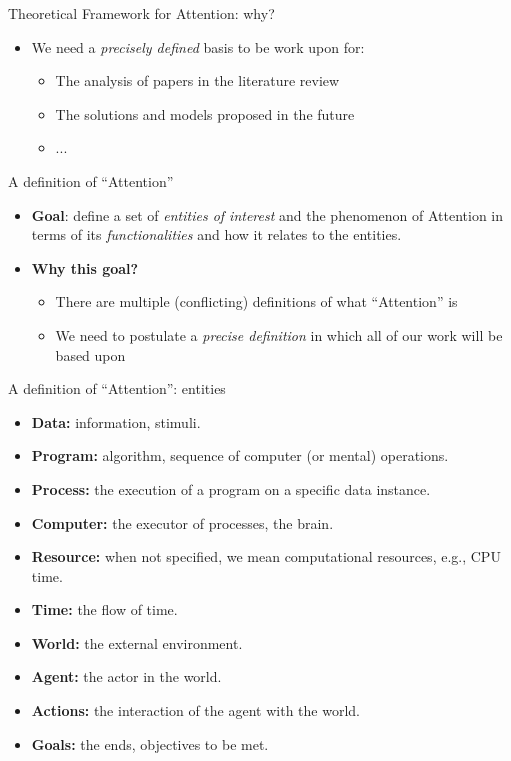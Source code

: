 \documentclass[10pt]{beamer}
\begin{document}
\begin{frame}{Theoretical Framework for Attention: why?}
    \begin{itemize}
        \item We need a \emph{precisely defined} basis to be work upon for:
        \begin{itemize}
            \item The analysis of papers in the literature review
            \item The solutions and models proposed in the future
            \item ...
        \end{itemize}
    \end{itemize}
\end{frame}

\begin{frame}{A definition of ``Attention''}
    \begin{itemize}
        \item \textbf{Goal}: define a set of \emph{entities of interest} and the phenomenon of Attention in terms of its \emph{functionalities} and how it relates to the entities.
        \item \textbf{Why this goal?}
            \begin{itemize}
                \item There are multiple (conflicting) definitions of what ``Attention'' is
                \item We need to postulate a \emph{precise definition} in which all of our work will be based upon
            \end{itemize}
    \end{itemize}
\end{frame}

\begin{frame}{A definition of ``Attention'': entities}
    \begin{itemize}
        \item\textbf{Data:} information, stimuli.
        \item\textbf{Program:} algorithm, sequence of computer (or mental) operations.
        \item\textbf{Process:} the execution of a program on a specific data instance.
        \item\textbf{Computer:} the executor of processes, the brain.
        \item\textbf{Resource:} when not specified, we mean computational resources, e.g., CPU time.
        \item\textbf{Time:} the flow of time.
        \item\textbf{World:} the external environment.
        \item\textbf{Agent:} the actor in the world.
        \item\textbf{Actions:} the interaction of the agent with the world.
        \item\textbf{Goals:} the ends, objectives to be met.
    \end{itemize}
\end{frame}
\end{document}
